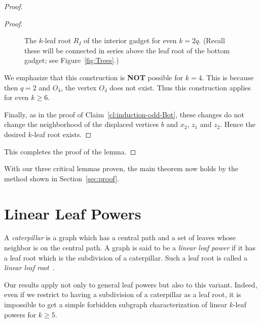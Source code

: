 \documentclass[11pt,letter]{article}
\theoremstyle{remark}
\begin{document}
\begin{proof}
\begin{proof}
\begin{figure}[h!]
        \caption{The $k$-leaf root $R_I$ of the interior gadget for even $k=2q$. (Recall these will be connected in series above the leaf root of the bottom gadget; see Figure~\ref{fig:Trees}.)}\label{fig:tree-even2}
    \end{figure}

    We emphasize that this construction is \textbf{NOT} possible for $k=4$. This is because then $q=2$ and $O_4$, the vertex $O_4$ does not exist. Thus this construction applies for even $k\ge 6$.

        Finally, as in the proof of Claim~\ref{cl:induction-odd-Bot}, these changes do not change the neighborhood of the displaced vertices $b$ and $x_2$, $z_1$ and $z_2$.
        Hence the desired $k$-leaf root exists.
    \end{proof}

    
This completes the proof of the lemma.
\end{proof}
With our three critical lemmas proven, the main theorem now holds
by the method shown in Section~\ref{sec:proof}.

\section{Linear Leaf Powers}\label{sec:linear}

A {\em caterpillar} is a graph which has a central path and a set of leaves whose neighbor is on the central path. A graph is said to be a \textit{linear leaf power} if it has a leaf root which is the subdivision of a caterpillar. Such a leaf root is called a \textit{linear leaf root}~\cite{Bergougnoux}.

Our results apply not only to general leaf powers but also to this variant. Indeed, even if we restrict to having a subdivision of a caterpillar as a leaf root, it is impossible to get a simple forbidden
subgraph characterization of linear $k$-leaf powers for $k \geq 5$.
\end{document}
